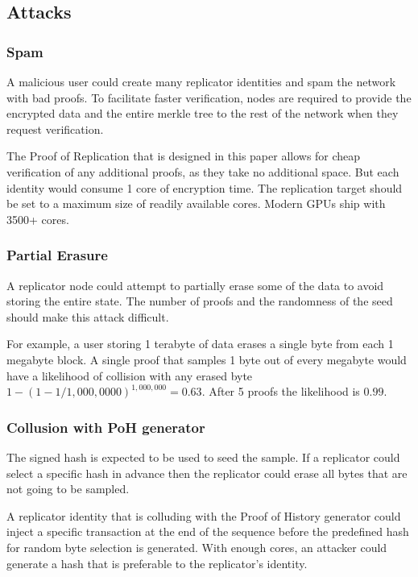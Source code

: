 \documentclass[12pt]{article}
\begin{document}
\subsection{Attacks}
\subsubsection{Spam}
A malicious user could create many replicator identities and spam the network with bad proofs. To facilitate faster verification, nodes are required to provide the encrypted data and the entire merkle tree to the rest of the network when they request verification.

The Proof of Replication that is designed in this paper allows for cheap verification of any additional proofs, as they take no additional space. But each identity would consume 1 core of encryption time. The replication target should be set to a maximum size of readily available cores. Modern GPUs ship with 3500+ cores.

\subsubsection{Partial Erasure}

A replicator node could attempt to partially erase some of the data to avoid storing the entire state. The number of proofs and the randomness of the seed should make this attack difficult.

For example, a user storing 1 terabyte of data erases a single byte from each 1 megabyte block. A single proof that samples 1 byte out of every megabyte would have a likelihood of collision with any erased byte \(1 - (1- 1/1,000,0000)^{1,000,000} = 0.63\). After 5 proofs the likelihood is \(0.99\).

\subsubsection{Collusion with PoH generator}

The signed hash is expected to be used to seed the sample. If a replicator could select a specific hash in advance then the replicator could erase all bytes that are not going to be sampled.

A replicator identity that is colluding with the Proof of History generator could inject a specific transaction at the end of the sequence before the predefined hash for random byte selection is generated. With enough cores, an attacker could generate a hash that is preferable to the replicator’s identity.
\end{document}

